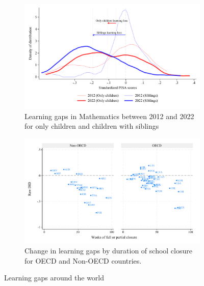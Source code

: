 


\begin{figure}[htbp]
    \centering
    
    \begin{subfigure}{\textwidth}
        \centering
        \includegraphics[width=\textwidth]{./FIGURES/Descriptive/PISA_distribution_2012_2022_PV4MATH.pdf}
        \caption{Learning gaps in Mathematics between 2012 and 2022 for only children and children with siblings}
        \label{fig:1a}
    \end{subfigure}
    
    \vspace{1em} %
    
    \begin{subfigure}{\textwidth}
        \centering
        \includegraphics[width=\textwidth]{./FIGURES/Descriptive/PISA_raw_DID_PV4MATH_not_fully_open.pdf}
        \caption{Change in learning gaps by duration of school closure for OECD and Non-OECD countries.}
        \label{fig:1b}
    \end{subfigure}
    
    \caption{Learning gaps around the world}
    \label{fig:pisa}
\end{figure}



